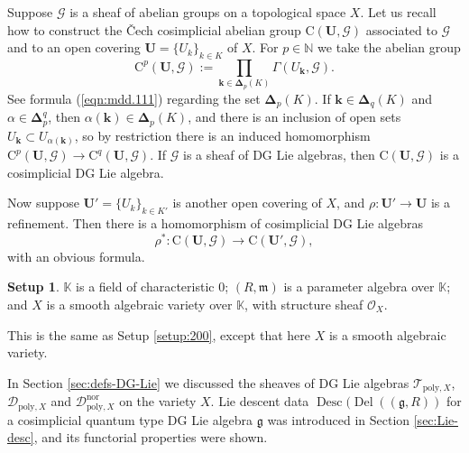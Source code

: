 \documentclass[a4paper, 10pt]{amsart}
\theoremstyle{definition}
\newtheorem{setup}[equation]{Setup}
\numberwithin{equation}{section}
\newcommand{\opn}{\operatorname}
\newcommand{\mfrak}[1]{\mathfrak{#1}}
\newcommand{\mcal}[1]{\mathcal{#1}}
\newcommand{\mrm}[1]{\mathrm{#1}}
\newcommand{\mbb}[1]{\mathbb{#1}}
\newcommand{\bsym}[1]{\boldsymbol{#1}}
\newcommand{\K}{\mbb{K}}
\newcommand{\g}{\mfrak{g}}
\newcommand{\m}{\mfrak{m}}
\newcommand{\al}{\alpha}
\begin{document}
Suppose $\mcal{G}$ is a sheaf of abelian groups on a topological space $X$. 
Let us recall how to construct the \v{C}ech cosimplicial abelian group
$\mrm{C}(\bsym{U}, \mcal{G})$ associated to $\mcal{G}$ and to an  
open covering $\bsym{U} = \{ U_k \}_{k \in K}$ of $X$. 
For $p \in \mbb{N}$ we take the abelian group
\begin{equation} \label{eqn:Lie-Geo.103}
\mrm{C}^p(\bsym{U}, \mcal{G}) := 
\prod_{\bsym{k} \in \bsym{\Delta}_p(K)}
\Gamma(U_{\bsym{k}}, \mcal{G}) .
\end{equation}
See formula (\ref{eqn:mdd.111}) regarding the set $\bsym{\Delta}_p(K)$.
If $\bsym{k} \in \bsym{\Delta}_q(K)$ and
$\alpha \in \bsym{\Delta}^q_p$, then
$\al(\bsym{k}) \in \bsym{\Delta}_p(K)$, and there is an inclusion of open sets
$U_{\bsym{k}} \subset U_{\alpha(\bsym{k})}$,
so by restriction there is an induced homomorphism
$\mrm{C}^p(\bsym{U}, \mcal{G}) \to 
\mrm{C}^q(\bsym{U}, \mcal{G})$.
If $\mcal{G}$ is a sheaf of DG Lie algebras, then $\mrm{C}(\bsym{U}, \mcal{G})$
is a cosimplicial DG Lie algebra.

Now suppose 
$\bsym{U}' = \{ U_k \}_{k \in K'}$
is another open covering of $X$, and 
$\rho : \bsym{U}' \to \bsym{U}$ is a refinement.
Then there is a homomorphism of cosimplicial DG Lie algebras 
\begin{equation} \label{eqn:Lie-Geo.106}
\rho^* : \mrm{C}(\bsym{U}, \mcal{G}) \to 
\mrm{C}(\bsym{U}', \mcal{G}) ,
\end{equation}
with an obvious formula. 

\begin{setup} \label{setup:6}
$\K$ is a field of characteristic $0$; $(R, \m)$ is a parameter 
algebra over $\K$; and $X$ is a smooth algebraic variety
over $\K$, with structure sheaf $\mcal{O}_X$.
\end{setup}

This is the same as Setup \ref{setup:200}, except that here $X$ is a smooth
algebraic variety.

In Section \ref{sec:defs-DG-Lie} we discussed the sheaves of DG Lie algebras  
$\mcal{T}_{\mrm{poly}, X}$, $\mcal{D}_{\mrm{poly}, X}$ and 
$\mcal{D}_{\mrm{poly}, X}^{\mrm{nor}}$ on the variety $X$. 
Lie descent data $\opn{Desc}(\opn{Del}((\g, R))$ for a cosimplicial quantum
type DG Lie algebra $\g$ was introduced in Section \ref{sec:Lie-desc}, and
its functorial properties were shown.
\end{document}
